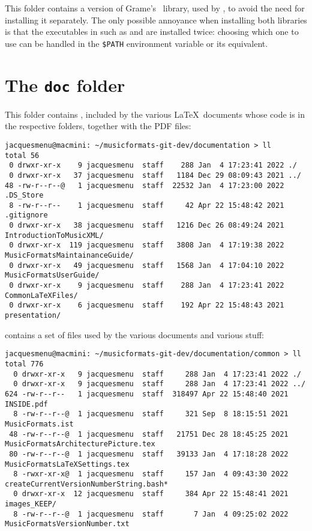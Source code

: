 This folder contains a version of Grame's \libmusicxml\ library, used by \mf, to avoid the need for installing it separately. The only possible annoyance when installing both libraries is that the executables in  such as  and  are installed twice: choosing which one to use can be handled in the {\tt \$\textbraceleft PATH\textbraceright} environment variable or its equivalent.


\section{The {\tt doc} folder}

This folder contains , included by the various \LaTeX\ documents whose code is in the respective folders, together with the PDF files:
\begin{lstlisting}[language=Terminal]
jacquesmenu@macmini: ~/musicformats-git-dev/documentation > ll
total 56
 0 drwxr-xr-x    9 jacquesmenu  staff    288 Jan  4 17:23:41 2022 ./
 0 drwxr-xr-x   37 jacquesmenu  staff   1184 Dec 29 08:09:43 2021 ../
48 -rw-r--r--@   1 jacquesmenu  staff  22532 Jan  4 17:23:00 2022 .DS_Store
 8 -rw-r--r--    1 jacquesmenu  staff     42 Apr 22 15:48:42 2021 .gitignore
 0 drwxr-xr-x   38 jacquesmenu  staff   1216 Dec 26 08:49:24 2021 IntroductionToMusicXML/
 0 drwxr-xr-x  119 jacquesmenu  staff   3808 Jan  4 17:19:38 2022 MusicFormatsMaintainanceGuide/
 0 drwxr-xr-x   49 jacquesmenu  staff   1568 Jan  4 17:04:10 2022 MusicFormatsUserGuide/
 0 drwxr-xr-x    9 jacquesmenu  staff    288 Jan  4 17:23:41 2022 CommonLaTeXFiles/
 0 drwxr-xr-x    6 jacquesmenu  staff    192 Apr 22 15:48:43 2021 presentation/
\end{lstlisting}

 contains a set of files used by the various documents and various stuff:
\begin{lstlisting}[language=Terminal]
jacquesmenu@macmini: ~/musicformats-git-dev/documentation/common > ll
total 776
  0 drwxr-xr-x   9 jacquesmenu  staff     288 Jan  4 17:23:41 2022 ./
  0 drwxr-xr-x   9 jacquesmenu  staff     288 Jan  4 17:23:41 2022 ../
624 -rw-r--r--   1 jacquesmenu  staff  318497 Apr 22 15:48:40 2021 INSIDE.pdf
  8 -rw-r--r--@  1 jacquesmenu  staff     321 Sep  8 18:15:51 2021 MusicFormats.ist
 48 -rw-r--r--@  1 jacquesmenu  staff   21751 Dec 28 18:45:25 2021 MusicFormatsArchitecturePicture.tex
 80 -rw-r--r--@  1 jacquesmenu  staff   39133 Jan  4 17:18:28 2022 MusicFormatsLaTeXSettings.tex
  8 -rwxr-xr-x@  1 jacquesmenu  staff     157 Jan  4 09:43:30 2022 createCurrentVersionNumberString.bash*
  0 drwxr-xr-x  12 jacquesmenu  staff     384 Apr 22 15:48:41 2021 images_KEEP/
  8 -rw-r--r--@  1 jacquesmenu  staff       7 Jan  4 09:25:02 2022  MusicFormatsVersionNumber.txt
\end{lstlisting}

